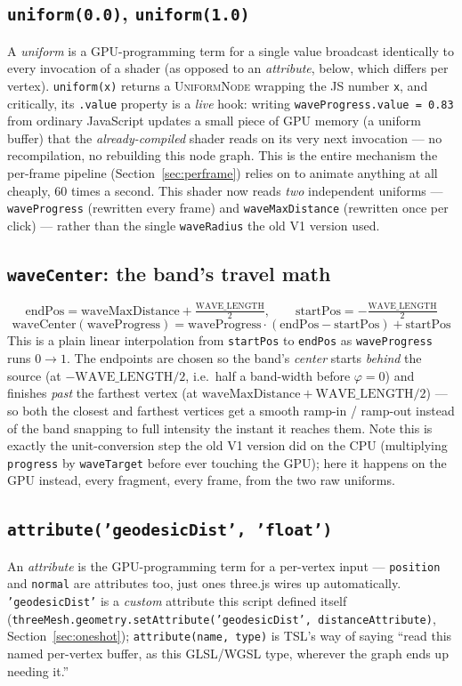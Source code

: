 \documentclass[11pt]{article}
\newcommand{\code}[1]{\texttt{#1}}
\newcommand{\func}[1]{\texttt{\textbf{#1}}}
\newcommand{\type}[1]{\textsc{#1}}
\begin{document}
\subsection*{\func{uniform(0.0)}, \func{uniform(1.0)}}
A \emph{uniform} is a GPU-programming term for a single value broadcast identically to
every invocation of a shader (as opposed to an \emph{attribute}, below, which differs per
vertex). \code{uniform(x)} returns a \type{UniformNode} wrapping the JS number \code{x},
and critically, its \code{.value} property is a \emph{live} hook: writing
\code{waveProgress.value = 0.83} from ordinary JavaScript updates a small piece of GPU
memory (a uniform buffer) that the \emph{already-compiled} shader reads on its very next
invocation --- no recompilation, no rebuilding this node graph. This is the entire
mechanism the per-frame pipeline (Section~\ref{sec:perframe}) relies on to animate anything
at all cheaply, 60 times a second. This shader now reads \emph{two} independent uniforms
--- \code{waveProgress} (rewritten every frame) and \code{waveMaxDistance} (rewritten once
per click) --- rather than the single \code{waveRadius} the old V1 version used.

\subsection*{\code{waveCenter}: the band's travel math}
\[
  \text{endPos} = \text{waveMaxDistance} + \tfrac{\text{WAVE\_LENGTH}}{2}, \qquad
  \text{startPos} = -\tfrac{\text{WAVE\_LENGTH}}{2}
\]
\[
  \text{waveCenter}(\text{waveProgress}) = \text{waveProgress}\cdot(\text{endPos}-\text{startPos}) + \text{startPos}
\]
This is a plain linear interpolation from \code{startPos} to \code{endPos} as
\code{waveProgress} runs $0\to1$. The endpoints are chosen so the band's \emph{center}
starts \emph{behind} the source (at $-\text{WAVE\_LENGTH}/2$, i.e.\ half a band-width before
$\varphi=0$) and finishes \emph{past} the farthest vertex (at
$\text{waveMaxDistance}+\text{WAVE\_LENGTH}/2$) --- so both the closest and farthest
vertices get a smooth ramp-in / ramp-out instead of the band snapping to full intensity the
instant it reaches them. Note this is exactly the unit-conversion step the old V1 version
did on the CPU (multiplying \code{progress} by \code{waveTarget} before ever touching the
GPU); here it happens on the GPU instead, every fragment, every frame, from the two raw
uniforms.

\subsection*{\func{attribute('geodesicDist', 'float')}}
An \emph{attribute} is the GPU-programming term for a per-vertex input --- \code{position}
and \code{normal} are attributes too, just ones three.js wires up automatically.
\code{'geodesicDist'} is a \emph{custom} attribute this script defined itself
(\code{threeMesh.geometry.setAttribute('geodesicDist', distanceAttribute)},
Section~\ref{sec:oneshot}); \code{attribute(name, type)} is TSL's way of saying ``read this
named per-vertex buffer, as this GLSL/WGSL type, wherever the graph ends up needing it.''
\end{document}
